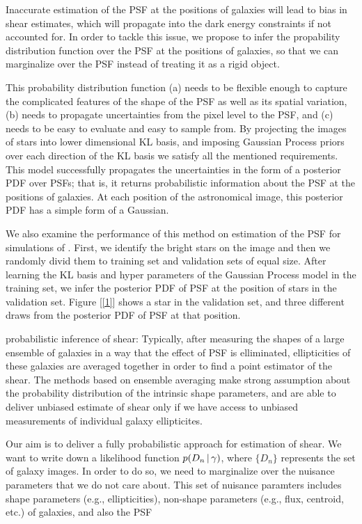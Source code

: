 \documentclass[12pt]{article}
\newcommand{\data}{D}
\newcommand{\shear}{\gamma}
\begin{document}
Inaccurate estimation of the PSF at the positions of galaxies will lead to bias in shear estimates,
which will propagate into the dark energy constraints if not accounted for. In order to
tackle this issue, we propose to infer the propability distribution function over the PSF
at the positions of galaxies, so that we can marginalize over the PSF instead of treating it 
as a rigid object.

This probability distribution function (a) needs to be flexible enough to capture the complicated 
features of the shape of the PSF as well as its spatial variation, (b) needs to propagate uncertainties
from the pixel level to the PSF, and (c) needs to be easy to evaluate and easy to sample from. By 
projecting the images of stars into lower dimensional KL basis, and imposing Gaussian Process priors 
over each direction of the KL basis we satisfy all the mentioned requirements. This model successfully propagates
the uncertainties in the form of a posterior PDF over PSFs; 
that is, it returns probabilistic information about the PSF at the positions of galaxies. At each
position of the astronomical image, this posterior PDF has a simple form of a Gaussian.

We also examine the performance of this method on estimation of the PSF for simulations 
of \lsst. First, we identify the bright stars on the image and then we randomly divid
them to training set and validation sets of equal size. After learning the KL basis and 
hyper parameters of the Gaussian Process model in the training set, we infer the posterior 
PDF of PSF at the position of stars in the validation set. Figure [\ref{1}] shows a star
in the validation set, and three different draws from the posterior PDF of PSF at that position.

probabilistic inference of shear:
Typically, after measuring the shapes
of a large ensemble of galaxies in a way that
the effect of PSF is elliminated, ellipticities
of these galaxies are averaged together in order to
find a point estimator of the shear.
The methods based on ensemble averaging make strong assumption
about the probability distribution of the intrinsic shape parameters,
and are able to deliver unbiased estimate of shear only if we
have access to unbiased measurements of individual galaxy
ellipticites. 

Our aim is to deliver a fully probabilistic approach for estimation of shear.
We want to write down a likelihood function $p(\data_n\given\shear)$, where $\{\data_n\}$
represents the set of galaxy images. In order to do so, we need to marginalize over the
nuisance parameters that we do not care about. This set of nuisance paramters includes 
shape parameters (e.g., ellipticities), non-shape parameters (e.g., flux, centroid, etc.)
of galaxies, and also the PSF
\end{document}
